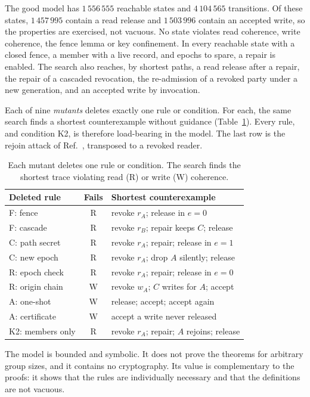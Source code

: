 \documentclass[aps,prx,reprint,superscriptaddress,nofootinbib,floatfix]{revtex4-2}
\theoremstyle{remark}
\begin{document}
The good model has $1\,556\,555$ reachable states and $4\,104\,565$ transitions. Of these states, $1\,457\,995$ contain a read release and $1\,503\,996$ contain an accepted write, so the properties are exercised, not vacuous. No state violates read coherence, write coherence, the fence lemma or key confinement. In every reachable state with a closed fence, a member with a live record, and epochs to spare, a repair is enabled. The search also reaches, by shortest paths, a read release after a repair, the repair of a cascaded revocation, the re-admission of a revoked party under a new generation, and an accepted write by invocation.

Each of nine \emph{mutants} deletes exactly one rule or condition. For each, the same search finds a shortest counterexample without guidance (Table~\ref{tab:mutants}). Every rule, and condition K2, is therefore load-bearing in the model. The last row is the rejoin attack of Ref.~\cite{etk}, transposed to a revoked reader.

\begin{table}[t]
\caption{Each mutant deletes one rule or condition. The search finds the shortest trace violating read (R) or write (W) coherence.}
\label{tab:mutants}
\begin{ruledtabular}
\begin{tabular}{@{}l@{\;}c@{\;}l@{}}
Deleted rule & Fails & Shortest counterexample\\
\hline
F: fence & R & revoke $r_A$; release in $e{=}0$\\
F: cascade & R & revoke $r_B$; repair keeps $C$; release\\
C: path secret & R & revoke $r_A$; repair; release in $e{=}1$\\
C: new epoch & R & revoke $r_A$; drop $A$ silently; release\\
R: epoch check & R & revoke $r_A$; repair; release in $e{=}0$\\
R: origin chain & W & revoke $w_A$; $C$ writes for $A$; accept\\
A: one-shot & W & release; accept; accept again\\
A: certificate & W & accept a write never released\\
K2: members only & R & revoke $r_A$; repair; $A$ rejoins; release\\
\end{tabular}
\end{ruledtabular}
\end{table}

The model is bounded and symbolic. It does not prove the theorems for arbitrary group sizes, and it contains no cryptography. Its value is complementary to the proofs: it shows that the rules are individually necessary and that the definitions are not vacuous.
\end{document}
